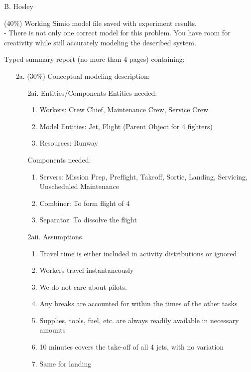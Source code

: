 \documentclass[answers]{exam}
\begin{document}
\hspace{\fill} {\large B. Hosley}
\bigskip

\begin{questions}
\unframedsolutions

\question 
(40\%) Working Simio model file saved with experiment results. \\
- There is not only one correct model for this problem. 
You have room for creativity while still accurately modeling the described system.

\question 
Typed summary report (no more than 4 pages) containing:
\begin{enumerate}
	\item[2a.] (30\%) Conceptual modeling description:
	\begin{solution}
		\begin{enumerate}
			\item[2ai.] Entities/Components
				Entities needed:
				\begin{enumerate}
					\item Workers: Crew Chief, Maintenance Crew, Service Crew 
					\item Model Entities: Jet, Flight (Parent Object for 4 fighters)
					\item Resources: Runway
				\end{enumerate}
				Components needed:
				\begin{enumerate}
					\item Servers: Mission Prep, Preflight, Takeoff, Sortie, Landing, Servicing, Unscheduled Maintenance
					\item Combiner: To form flight of 4
					\item Separator: To dissolve the flight
				\end{enumerate}
			
			\item[2aii.] Assumptions
				\begin{enumerate}
					\item Travel time is either included in activity distributions or ignored
					\item Workers travel instantaneously
					\item We do not care about pilots.
					\item Any breaks are accounted for within the times of the other tasks
					\item Supplies, tools, fuel, etc. are always readily available in necessary amounts
					\item 10 minutes covers the take-off of all 4 jets, with no variation
					\item Same for landing
				\end{enumerate}
			

\end{enumerate}
\end{solution}
\end{enumerate}
\end{questions}
\end{document}
